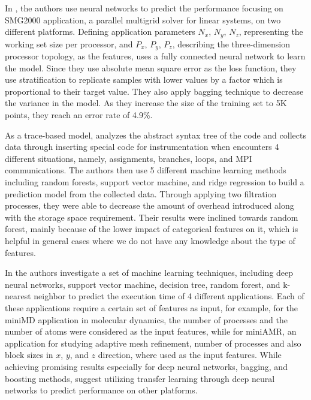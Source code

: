 In \cite{ipek2005approach}, the authors use neural networks to predict the performance focusing on SMG2000 application, a parallel multigrid solver for linear systems\cite{falgout2002hypre}, on two different platforms. Defining application parameters $N_x$, $N_y$, $N_z$, representing the working set size per processor, and $P_x$, $P_y$, $P_z$, describing the three-dimension processor topology, as the features, \cite{ipek2005approach} uses a fully connected neural network to learn the model. Since they use absolute mean square error as the loss function, they use stratification to replicate samples with lower values by a factor which is proportional to their target value. They also apply bagging technique to decrease the variance in the model. As they increase the size of the training set to 5K points, they reach an error rate of 4.9\%. 

As a trace-based model, \cite{sun2017automated} analyzes the abstract syntax tree of the code and collects data through inserting special code for instrumentation when encounters 4 different situations, namely, assignments, branches, loops, and MPI communications. The authors then use 5 different machine learning methods including random forests, support vector machine, and ridge regression to build a prediction model from the collected data. Through applying two filtration processes, they were able to decrease the amount of overhead introduced along with the storage space requirement. Their results were inclined towards random forest, mainly because of the lower impact of categorical features on it, which is helpful in general cases where we do not have any knowledge about the type of features\cite{sun2017automated}.  
	
In \cite{malakar2018benchmarking} the authors investigate a set of machine learning techniques, including deep neural networks, support vector machine, decision tree, random forest, and k-nearest neighbor to predict the execution time of 4 different applications. Each of these applications require a certain set of features as input, for example, for the miniMD application in molecular dynamics, the number of processes and the number of atoms were considered as the input features, while for miniAMR, an application for studying adaptive mesh refinement, number of processes and also block sizes in $x$, $y$, and $z$ direction, where used as the input features. While achieving promising results especially for deep neural networks, bagging, and boosting methods, \cite{malakar2018benchmarking} suggest utilizing transfer learning through deep neural networks to predict performance on other platforms.
%	

